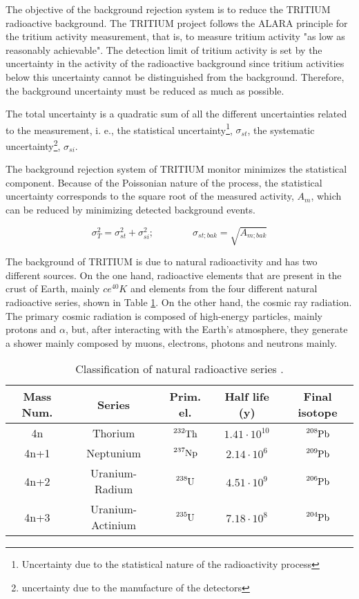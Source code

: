 The objective of the background rejection system is to reduce the TRITIUM radioactive background. The TRITIUM project follows the ALARA principle for the tritium activity measurement, that is, to measure tritium activity "as low as reasonably achievable". The detection limit of tritium activity is set by the uncertainty in the activity of the radioactive background since tritium activities below this uncertainty cannot be distinguished from the background. Therefore, the background uncertainty must be reduced as much as possible.

The total uncertainty is a quadratic sum of all the different uncertainties related to the measurement, i. e., the statistical uncertainty\footnote{Uncertainty due to the statistical nature of the radioactivity process}, $\sigma_{st}$, the systematic uncertainty\footnote{uncertainty due to the manufacture of the detectors}, $\sigma_{si}$.

The background rejection system of TRITIUM monitor minimizes the statistical component. Because of the Poissonian nature of the process, the statistical uncertainty corresponds to the square root of the measured activity, $A_{m}$, which can be reduced by minimizing detected background events.

\begin{equation}
\sigma_{T}^2 = \sigma_{st}^2 +\sigma_{si}^2; \qquad \qquad \sigma_{st;bak} = \sqrt{A_{m;bak}}
\label{eq:SquareSumUncerainty}
\end{equation} 

The background of TRITIUM is due to natural radioactivity and has two different sources. On the one hand, radioactive elements that are present in the crust of Earth, mainly $ce{^{40}K}$ and elements from the four different natural radioactive series, shown in Table \ref{tab:NaturalRadioactiveSeries}. On the other hand, the cosmic ray radiation. The primary cosmic radiation is composed of high-energy particles, mainly protons and $\alpha$, but, after interacting with the Earth's atmosphere, they generate a shower mainly composed by muons, electrons, photons and neutrons mainly.

\begin{table}[htbp]
\begin{center}
\begin{tabular}{|c|c|c|c|c|}
\hline
Mass Num. & Series & Prim. el. & Half life (y) & Final isotope \\
\hline \hline \hline
4n & Thorium & $\ce{^{232}Th}$ & $1.41 \cdot{} 10^{10}$ & $\ce{^{208}Pb}$ \\ \hline
4n+1 & Neptunium & $\ce{^{237}Np}$ & $2.14 \cdot{} 10^{6}$ & $\ce{^{209}Pb}$ \\ \hline
4n+2 & Uranium-Radium & $\ce{^{238}U}$ & $4.51 \cdot{} 10^{9}$ & $\ce{^{206}Pb}$ \\ \hline
4n+3 & Uranium-Actinium & $\ce{^{235}U}$ & $7.18 \cdot{} 10^{8}$ & $\ce{^{204}Pb}$ \\ \hline
\end{tabular}
\caption{Classification of natural radioactive series \cite{NaturalRadioactiveSeries1, NaturalRadioactiveSeries2}.}
\label{tab:NaturalRadioactiveSeries}
\end{center}
\end{table}

